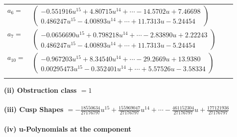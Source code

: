 \documentclass[1p]{elsarticle_modified}
\theoremstyle{definition}
\begin{document}
\begin{tabular}{m{7pt} m{180pt} m{7pt} m{180pt} }
\flushright $a_{6}=$&$\begin{pmatrix}-0.551916 u^{15}+4.80715 u^{14}+\cdots-14.5702 u+7.46698\\0.486247 u^{15}-4.00893 u^{14}+\cdots+11.7313 u-5.24454\end{pmatrix}$ \\
\flushright $a_{7}=$&$\begin{pmatrix}-0.0656690 u^{15}+0.798218 u^{14}+\cdots-2.83890 u+2.22243\\0.486247 u^{15}-4.00893 u^{14}+\cdots+11.7313 u-5.24454\end{pmatrix}$ \\
\flushright $a_{10}=$&$\begin{pmatrix}-0.967203 u^{15}+8.34540 u^{14}+\cdots-29.2669 u+13.9380\\0.00295473 u^{15}-0.352401 u^{14}+\cdots+5.57526 u-3.58334\end{pmatrix}$\\&\end{tabular}
\flushleft \textbf{(ii) Obstruction class $= 1$}\\~\\
\flushleft \textbf{(iii) Cusp Shapes $= -\frac{18550634}{27176797} u^{15}+\frac{155969047}{27176797} u^{14}+\cdots-\frac{461152304}{27176797} u+\frac{177121936}{27176797}$}\\~\\
\newpage\renewcommand{\arraystretch}{1}
\flushleft \textbf{(iv) u-Polynomials at the component}\newline \\
\end{document}
